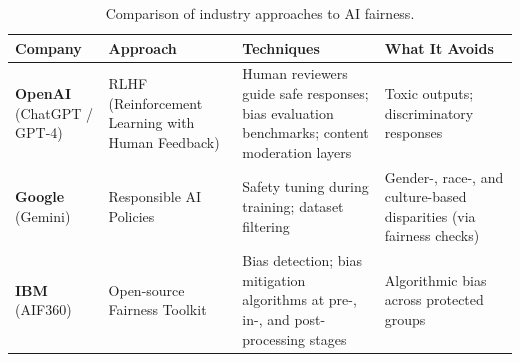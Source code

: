 \begin{table}[H]
\centering
\renewcommand{\arraystretch}{1.35}
\begin{tabularx}{\textwidth}{lXXX}
\toprule
\textbf{Company} & \textbf{Approach} & \textbf{Techniques} & \textbf{What It Avoids} \\
\midrule
\textbf{OpenAI} \newline (ChatGPT / GPT-4) &
    RLHF (Reinforcement Learning with Human Feedback)~\cite{ouyang2022rlhf} &
    Human reviewers guide safe responses; bias evaluation benchmarks; content
    moderation layers &
    Toxic outputs; discriminatory responses \\
\addlinespace
\textbf{Google} \newline (Gemini) &
    Responsible AI Policies~\cite{gemini2023} &
    Safety tuning during training; dataset filtering &
    Gender-, race-, and culture-based disparities (via fairness checks) \\
\addlinespace
\textbf{IBM} \newline (AIF360) &
    Open-source Fairness Toolkit~\cite{aif360} &
    Bias detection; bias mitigation algorithms at pre-, in-, and
    post-processing stages &
    Algorithmic bias across protected groups \\
\bottomrule
\end{tabularx}
\caption{Comparison of industry approaches to AI fairness.}
\label{tab:industry_comparison}
\end{table}
